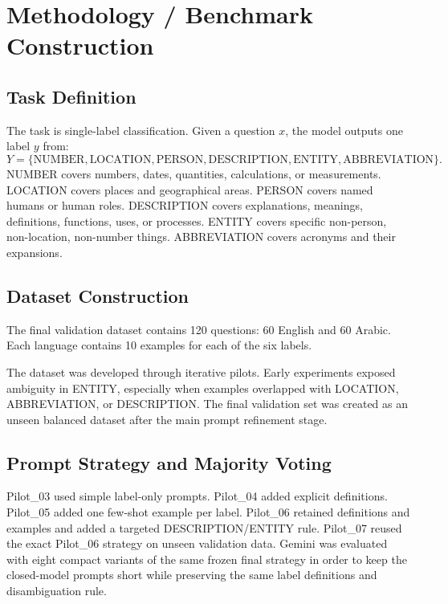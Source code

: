 \documentclass[10pt,twocolumn]{article}
\begin{document}
\section{Methodology / Benchmark Construction}
\subsection{Task Definition}
The task is single-label classification. Given a question $x$, the model outputs one label $y$ from:
\begin{equation}
Y = \{\text{NUMBER}, \text{LOCATION}, \text{PERSON}, \text{DESCRIPTION}, \text{ENTITY}, \text{ABBREVIATION}\}.
\end{equation}
NUMBER covers numbers, dates, quantities, calculations, or measurements. LOCATION covers places and geographical areas. PERSON covers named humans or human roles. DESCRIPTION covers explanations, meanings, definitions, functions, uses, or processes. ENTITY covers specific non-person, non-location, non-number things. ABBREVIATION covers acronyms and their expansions.
\subsection{Dataset Construction}
The final validation dataset contains 120 questions: 60 English and 60 Arabic. Each language contains 10 examples for each of the six labels.
\begin{table}[H]\centering\caption{Validation dataset distribution.}\label{tab:dataset}\end{table}
The dataset was developed through iterative pilots. Early experiments exposed ambiguity in ENTITY, especially when examples overlapped with LOCATION, ABBREVIATION, or DESCRIPTION. The final validation set was created as an unseen balanced dataset after the main prompt refinement stage.
\subsection{Prompt Strategy and Majority Voting}
Pilot_03 used simple label-only prompts. Pilot_04 added explicit definitions. Pilot_05 added one few-shot example per label. Pilot_06 retained definitions and examples and added a targeted DESCRIPTION/ENTITY rule. Pilot_07 reused the exact Pilot_06 strategy on unseen validation data. Gemini was evaluated with eight compact variants of the same frozen final strategy in order to keep the closed-model prompts short while preserving the same label definitions and disambiguation rule.
\end{document}
